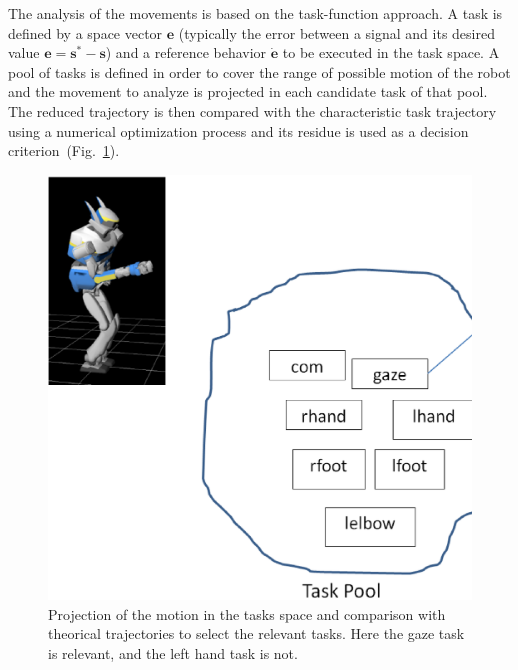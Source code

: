 \documentclass[letterpaper, 10pt, conference]{ieeeconf}      %
\begin{document}
The analysis of the movements is based on the task-function approach.
A task is defined by a space vector $\mathbf{e}$ (typically the error between a
signal and its desired value $\mathbf{e} = \mathbf{s}^{*} - \mathbf{s}$) and a reference
behavior $\mathbf{\dot{e}}$ to be executed in the task space.
A pool of tasks is defined
in order to cover the range of possible motion of the robot and the
movement to analyze is projected in each candidate task of that pool. 
The reduced trajectory is then compared with the characteristic task trajectory
using a numerical optimization process and its residue is used as a 
decision criterion~(Fig.~\ref{fig:projection}).
\begin{figure}[t]
\begin{center}
\includegraphics[width=0.9\linewidth]{img/projection.ps}
\end{center}
\caption{Projection of the motion in the tasks space and comparison with
theorical trajectories to select the relevant tasks. Here the gaze task is relevant,
and the left hand task is not.}
\label{fig:projection}
\end{figure}
\end{document}
